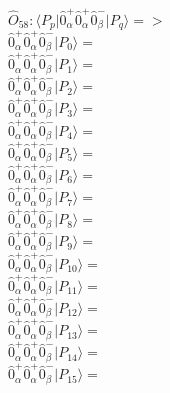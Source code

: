 \documentclass[14pt]{article}
\begin{document}
    $\hat{O}_{58}:  \langle{P_p}\vert \hat{0}_{\alpha}^{+}\hat{0}_{\alpha}^{+}\hat{0}_{\beta}^{-} \vert{P_q}\rangle => $ \\ 
    $ \hat{0}_{\alpha}^{+}\hat{0}_{\alpha}^{+}\hat{0}_{\beta}^{-} \vert{P_{0}}\rangle =  $ \\ 
    $ \hat{0}_{\alpha}^{+}\hat{0}_{\alpha}^{+}\hat{0}_{\beta}^{-} \vert{P_{1}}\rangle =  $ \\ 
    $ \hat{0}_{\alpha}^{+}\hat{0}_{\alpha}^{+}\hat{0}_{\beta}^{-} \vert{P_{2}}\rangle =  $ \\ 
    $ \hat{0}_{\alpha}^{+}\hat{0}_{\alpha}^{+}\hat{0}_{\beta}^{-} \vert{P_{3}}\rangle =  $ \\ 
    $ \hat{0}_{\alpha}^{+}\hat{0}_{\alpha}^{+}\hat{0}_{\beta}^{-} \vert{P_{4}}\rangle =  $ \\ 
    $ \hat{0}_{\alpha}^{+}\hat{0}_{\alpha}^{+}\hat{0}_{\beta}^{-} \vert{P_{5}}\rangle =  $ \\ 
    $ \hat{0}_{\alpha}^{+}\hat{0}_{\alpha}^{+}\hat{0}_{\beta}^{-} \vert{P_{6}}\rangle =  $ \\ 
    $ \hat{0}_{\alpha}^{+}\hat{0}_{\alpha}^{+}\hat{0}_{\beta}^{-} \vert{P_{7}}\rangle =  $ \\ 
    $ \hat{0}_{\alpha}^{+}\hat{0}_{\alpha}^{+}\hat{0}_{\beta}^{-} \vert{P_{8}}\rangle =  $ \\ 
    $ \hat{0}_{\alpha}^{+}\hat{0}_{\alpha}^{+}\hat{0}_{\beta}^{-} \vert{P_{9}}\rangle =  $ \\ 
    $ \hat{0}_{\alpha}^{+}\hat{0}_{\alpha}^{+}\hat{0}_{\beta}^{-} \vert{P_{10}}\rangle =  $ \\ 
    $ \hat{0}_{\alpha}^{+}\hat{0}_{\alpha}^{+}\hat{0}_{\beta}^{-} \vert{P_{11}}\rangle =  $ \\ 
    $ \hat{0}_{\alpha}^{+}\hat{0}_{\alpha}^{+}\hat{0}_{\beta}^{-} \vert{P_{12}}\rangle =  $ \\ 
    $ \hat{0}_{\alpha}^{+}\hat{0}_{\alpha}^{+}\hat{0}_{\beta}^{-} \vert{P_{13}}\rangle =  $ \\ 
    $ \hat{0}_{\alpha}^{+}\hat{0}_{\alpha}^{+}\hat{0}_{\beta}^{-} \vert{P_{14}}\rangle =  $ \\ 
    $ \hat{0}_{\alpha}^{+}\hat{0}_{\alpha}^{+}\hat{0}_{\beta}^{-} \vert{P_{15}}\rangle =  $ \\ 
    
\end{document}
